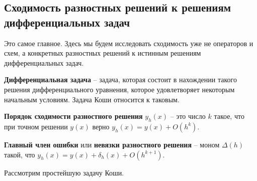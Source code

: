 \documentclass[../main.tex]{subfile}
\begin{document}
\subsection{Сходимость разностных решений к решениям дифференциальных задач}
Это самое главное. Здесь мы будем исследовать сходимость уже не операторов
и схем, а конкретных разностных решений к истинным решениям дифференциальных
задач.

\begin{define}
	\textbf{Дифференциальная задача} -- задача, которая состоит в
	нахождении такого решения дифференциального уравнения, которое
	удовлетворяет некоторым начальным условиям. Задача Коши относится к
	таковым.
\end{define}

\begin{define}
	\textbf{Порядок сходимости разностного решения} $y_h(x)$ -- это число
	$k$ такое, что при точном решении $y(x)$ верно $y_h(x)=y(x)+O(h^k)$.
\end{define}

\begin{define}
	\textbf{Главный член ошибки} или \textbf{невязки разностного решения}
	-- моном $\Delta(h)$ такой, что $y_h(x)=y(x)+\delta_h(x)+O(h^{k+1})$.
\end{define}

Рассмотрим простейшую задачу Коши.
\end{document}
